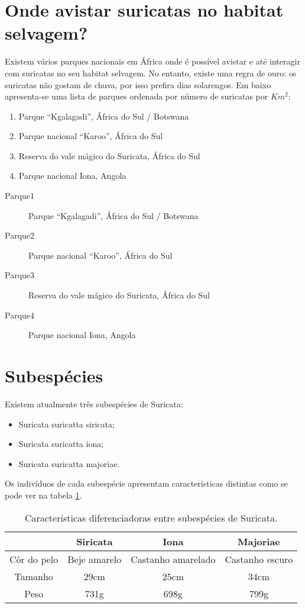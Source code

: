\documentclass[a4paper,10pt]{report}
\begin{document}
\section{Onde avistar suricatas no habitat selvagem?}
Existem vários parques nacionais em África onde é possível avistar e até interagir com suricatas no seu habitat selvagem. No entanto, existe uma regra de ouro: os suricatas não gostam de chuva, por isso prefira dias solarengos. Em baixo apresenta-se uma lista de parques ordenada por número de suricatas por $Km^2$:
\begin{enumerate}
\item Parque “Kgalagadi”, África do Sul / Botswana
\item Parque nacional “Karoo”, África do Sul
\item Reserva do vale mágico do Suricata, África do Sul
\item Parque nacional Iona, Angola
\end{enumerate}
\begin{description}
\item[Parque1] Parque “Kgalagadi”, África do Sul / Botswana
\item[Parque2] Parque nacional “Karoo”, África do Sul
\item[Parque3] Reserva do vale mágico do Suricata, África do Sul
\item[Parque4] Parque nacional Iona, Angola
\end{description}
\section{Subespécies}
Existem atualmente três subespécies de Suricata:
\begin{itemize}
\item Suricata suricatta siricata;
\item Suricata suricatta iona;
\item Suricata suricatta majoriae.
\end{itemize}
Os indivíduos de cada subespécie apresentam características distintas como se pode ver na tabela \ref{ss}.
\begin{table}
\centering
\begin{tabular}{c|c|c|c|}
\cline{2-4}
 & \cellcolor[HTML]{C0C0C0}\textbf{Siricata} & \cellcolor[HTML]{C0C0C0}\textbf{Iona} & \cellcolor[HTML]{C0C0C0}\textbf{Majoriae} \\ \hline
\multicolumn{1}{|c|}{Côr do pelo} & Beje amarelo &  Castanho amarelado & Castanho escuro \\ \hline
\multicolumn{1}{|c|}{Tamanho} & 29cm & 25cm & 34cm \\ \hline
\multicolumn{1}{|c|}{Peso} & 731g & 698g & 799g \\ \hline
\end{tabular}
\caption{Características diferenciadoras entre subespécies de Suricata.}
\label{ss}
\end{table}
\end{document}
